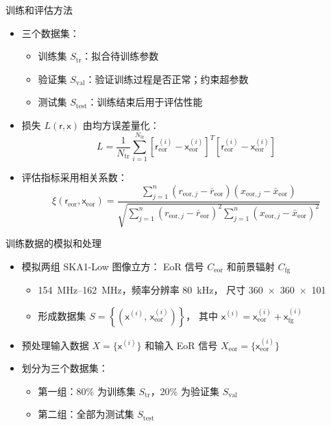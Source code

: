 \documentclass{beamer}
\newcommand{\R}[1]{\text{#1}}  %
\newcommand{\B}[1]{\bm{\mathsf{#1}}}  %
\begin{document}
\begin{frame}{训练和评估方法}
  \begin{itemize}
    \item 三个数据集：
      \begin{itemize}
        \item \alert{训练集 $S_{\R{tr}}$}：拟合待训练参数
        \item \alert{验证集 $S_{\R{val}}$}：验证训练过程是否正常；约束超参数
        \item \alert{测试集 $S_{\R{test}}$}：训练结束后用于评估性能
      \end{itemize}
    \item 损失 $L(\B{r}, \B{x})$ 由\alert{均方误差}量化：
      \begin{equation}
        L = \frac{1}{N_{\R{tr}}} \sum_{i=1}^{N_{\R{tr}}}
            \left[ \B{r}_{\R{eor}}^{(i)} - \B{x}_{\R{eor}}^{(i)} \right]^T
            \left[ \B{r}_{\R{eor}}^{(i)} - \B{x}_{\R{eor}}^{(i)} \right]
      \end{equation}
    \item 评估指标采用\alert{相关系数}：
      \begin{equation}
        \xi(\B{r}_{\R{eor}}, \B{x}_{\R{eor}})
          = \frac{\sum_{j=1}^{n}(r_{\R{eor},j} - \bar{r}_{\R{eor}})
              (x_{\R{eor},j} - \bar{x}_{\R{eor}})}{
                \sqrt{\sum_{j=1}^{n}(r_{\R{eor},j} - \bar{r}_{\R{eor}})^2
                \sum_{j=1}^{n}(x_{\R{eor},j} - \bar{x}_{\R{eor}})^2}
            }
      \end{equation}
  \end{itemize}
\end{frame}

\begin{frame}{训练数据的模拟和处理}
  \begin{itemize}
    \item 模拟两组 SKA1-Low 图像立方：
      EoR 信号 $C_{\R{eor}}$ 和前景辐射 $C_{\R{fg}}$
      \begin{itemize}
        \item \SIrange{154}{162}{\MHz}，频率分辨率 \SI{80}{\kHz}，
          尺寸 \num{360 x 360 x 101}
        \item 形成数据集 $S = \left\{ \left(\B{x}^{(i)},
          \,\B{x}^{(i)}_{\R{eor}} \right) \right\}$，
          其中 $\B{x}^{(i)} = \B{x}^{(i)}_{\R{eor}} + \B{x}^{(i)}_{\R{fg}}$
      \end{itemize}
    \item 预处理输入数据 $X = \big\{ \B{x}^{(i)} \big\}$
      和输入 EoR 信号 $X_{\R{eor}} = \big\{ \B{x}^{(i)}_{\R{eor}} \big\}$
    \item 划分为三个数据集：
      \begin{itemize}
        \item 第一组：80\% 为训练集 $S_{\R{tr}}$，20\% 为验证集 $S_{\R{val}}$
        \item 第二组：全部为测试集 $S_{\R{test}}$
      \end{itemize}
  \end{itemize}
\end{frame}
\end{document}
